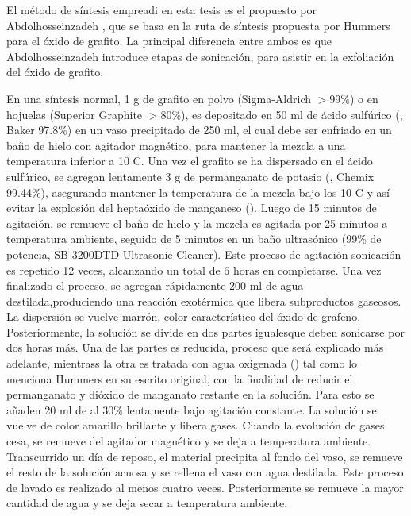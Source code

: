 El método de síntesis empreadi en esta tesis es el propuesto por Abdolhosseinzadeh \citep{Abdolhosseinzadeh2015}, que se basa en la ruta de síntesis propuesta por Hummers para el óxido de grafito. La principal diferencia entre ambos es que Abdolhosseinzadeh introduce etapas de sonicación, para asistir en la exfoliación del óxido de grafito.

En una síntesis normal, 1 g de grafito en polvo (Sigma-Aldrich $>$99\%) o en hojuelas (Superior Graphite $>$80\%), es depositado en 50 ml de ácido sulfúrico (, Baker 97.8\%) en un vaso precipitado de 250 ml, el cual debe ser enfriado en un baño de hielo con agitador magnético, para mantener la mezcla a una temperatura inferior a 10 \degree C. Una vez el grafito se ha dispersado en el ácido sulfúrico, se agregan lentamente 3 g de permanganato de potasio (, Chemix 99.44\%), asegurando mantener la temperatura de la mezcla bajo los 10 C y así evitar la explosión del heptaóxido de manganeso ()\citep{Dreyer2010}. Luego de 15 minutos de agitación, se remueve el baño de hielo y la mezcla es agitada por 25 minutos a temperatura ambiente, seguido de 5 minutos en un baño ultrasónico (99\% de potencia, SB-3200DTD Ultrasonic Cleaner). Este proceso de agitación-sonicación es repetido 12 veces, alcanzando un total de 6 horas en completarse. Una vez finalizado el proceso, se agregan rápidamente 200 ml de agua destilada,produciendo una reacción exotérmica que libera subproductos gaseosos. La dispersión se vuelve marrón, color característico del óxido de grafeno. Posteriormente, la solución se divide en dos partes igualesque deben sonicarse por dos horas más. Una de las partes es reducida, proceso que será explicado más adelante, mientrass la otra es tratada con agua oxigenada () tal como lo menciona Hummers en su escrito original, con la finalidad de reducir el permanganato y dióxido de manganato restante en la solución. Para esto se añaden 20 ml de  al 30\% lentamente bajo agitación constante. La solución se vuelve de color amarillo brillante y libera gases. Cuando la evolución de gases cesa, se remueve del agitador magnético y se deja a temperatura ambiente. Transcurrido un día de reposo, el material precipita al fondo del vaso, se remueve el resto de la solución acuosa y se rellena el vaso con agua destilada. Este proceso de lavado es realizado al menos cuatro veces. Posteriormente se remueve la mayor cantidad de agua y se deja secar a temperatura ambiente.


